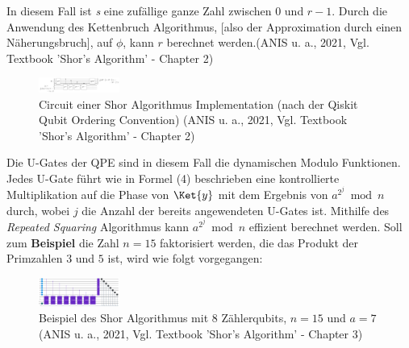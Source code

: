     In diesem Fall ist \textit{s} eine zufällige ganze Zahl zwischen \(0\) und \(r-1\). \newline
    \glqq Durch die Anwendung des Kettenbruch Algorithmus, [also der Approximation durch einen Näherungsbruch], auf \(\phi\), kann \(r\) berechnet werden.\grqq (ANIS u. a., 2021, Vgl. Textbook ’Shor’s Algorithm’ - Chapter 2)

    \begin{figure}
        \centering
        \includegraphics[width=100]{content/shor_circuit_1.JPG}
        \caption{Circuit einer Shor Algorithmus Implementation (nach der Qiskit Qubit Ordering Convention) (ANIS u. a., 2021, Vgl. Textbook ’Shor’s Algorithm’ - Chapter 2)}
        \label{fig:periodicExample}
    \end{figure}

	Die U-Gates der QPE sind in diesem Fall die dynamischen Modulo Funktionen. Jedes U-Gate führt wie in Formel (4) beschrieben eine kontrollierte Multiplikation auf die Phase von \(\Ket{y}\) mit dem Ergebnis von \(a^{2^j}\bmod{n}\) durch, wobei \(j\) die Anzahl der bereits angewendeten U-Gates ist. Mithilfe des \textit{Repeated Squaring} Algorithmus kann \(a^{2^j}\bmod{n}\) effizient berechnet werden. 
	Soll zum \textbf{Beispiel} die Zahl \(n=15\) faktorisiert werden, die das Produkt der Primzahlen \(3\) und \(5\) ist, wird wie folgt vorgegangen:


	
	    \begin{figure}
            \centering
            \includegraphics[width=100]{content/shor_example.PNG}
            \caption{Beispiel des Shor Algorithmus mit 8 Zählerqubits, \(n=15\) und \(a=7\) (ANIS u. a., 2021, Vgl. Textbook ’Shor’s Algorithm’ - Chapter 3)}
            \label{fig:shorExample}
        \end{figure}

